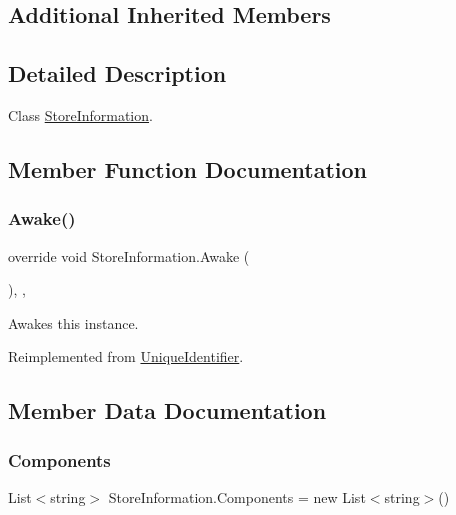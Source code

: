 \subsection*{Additional Inherited Members}


\subsection{Detailed Description}
Class \hyperlink{class_store_information}{Store\+Information}. 



\subsection{Member Function Documentation}
\mbox{\label{class_store_information_a4a751814bad3a0171ba3aaaa19a6c8e7}} 
\subsubsection{\texorpdfstring{Awake()}{Awake()}}
{\footnotesize\ttfamily override void Store\+Information.\+Awake (\begin{DoxyParamCaption}{ }\end{DoxyParamCaption})\hspace{0.3cm}{\ttfamily [inline]}, {\ttfamily [protected]}, {\ttfamily [virtual]}}



Awakes this instance. 



Reimplemented from \hyperlink{class_unique_identifier_adc29ef30266f6ac51f9489ce21d0f816}{Unique\+Identifier}.



\subsection{Member Data Documentation}
\mbox{\label{class_store_information_a0b1aa5065cb278253bc2f2cbff36bd6f}} 
\subsubsection{\texorpdfstring{Components}{Components}}
{\footnotesize\ttfamily List$<$string$>$ Store\+Information.\+Components = new List$<$string$>$()}




